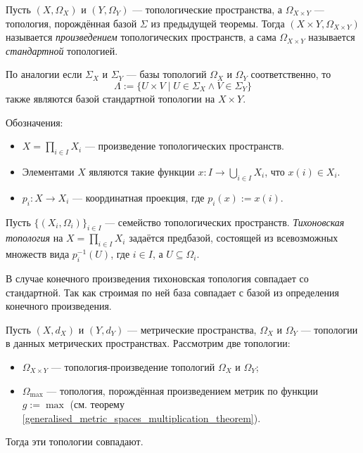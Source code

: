\documentclass[12pt,a4paper]{article}
\begin{document}
    \begin{definition}
        Пусть $(X, \Omega_X)$ и $(Y, \Omega_Y)$ --- топологические пространства, а $\Omega_{X \times Y}$ --- топология, порождённая базой $\Sigma$ из предыдущей теоремы. Тогда $(X \times Y, \Omega_{X \times Y})$ называется \emph{произведением} топологических пространств, а сама $\Omega_{X \times Y}$ называется \emph{стандартной} топологией.
    \end{definition}

    \begin{remark}
        По аналогии если $\Sigma_X$ и $\Sigma_Y$ --- базы топологий $\Omega_X$ и $\Omega_Y$ соответственно, то
        \[\Lambda := \{U \times V \mid U \in \Sigma_X \wedge V \in \Sigma_Y\}\]
        также являются базой стандартной топологии на $X \times Y$.
    \end{remark}

    \begin{definition}
        Обозначения:
        \begin{itemize}
            \item $X = \prod_{i \in I} X_i$ --- произведение топологических пространств.
            \item Элементами $X$ являются такие функции $x: I \to \bigcup_{i \in I} X_i$, что $x(i) \in X_i$.
            \item $p_i: X \to X_i$ --- координатная проекция, где $p_i(x) := x(i)$.
        \end{itemize}
    \end{definition}

    \begin{definition}
        Пусть $\{(X_i, \Omega_i)\}_{i \in I}$ --- семейство топологических пространств. \emph{Тихоновская топология} на $X = \prod_{i \in I} X_i$ задаётся предбазой, состоящей из всевозможных множеств вида $p_i^{-1}(U)$, где $i \in I$, а $U \subseteq \Omega_i$.
    \end{definition}

    \begin{remark}
        В случае конечного произведения тихоновская топология совпадает со стандартной. Так как строимая по ней база совпадает с базой из определения конечного произведения.       
    \end{remark}

    \begin{theorem}
        Пусть $(X, d_X)$ и $(Y, d_Y)$ --- метрические пространства, $\Omega_X$ и $\Omega_Y$ --- топологии в данных метрических пространствах. Рассмотрим две топологии:
        \begin{itemize}
            \item $\Omega_{X \times Y}$ --- топология-произведение топологий $\Omega_X$ и $\Omega_Y$;
            \item $\Omega_{\max}$ --- топология, порождённая произведением метрик по функции $g := \max$ (см. теорему \ref{generalised_metric_spaces_multiplication_theorem}).
        \end{itemize}
        Тогда эти топологии совпадают.
    \end{theorem}
\end{document}
